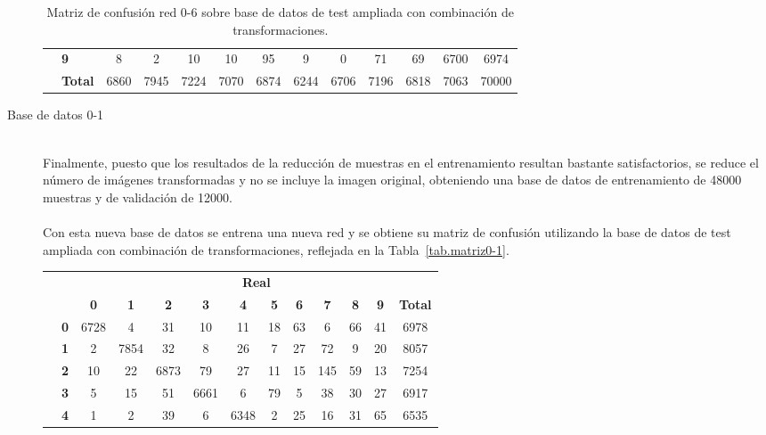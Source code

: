 \begin{description}
\begin{table}[H]
\begin{tabular}{|c|l|c|c|c|c|c|c|c|c|c|c|c|}
			& \textbf{9} & 8 & 2 & 10 & 10 & 95 & 9 & 0 & 71 & 69 & \cellcolor{lightgray}6700 & 6974\\ \cline{2-13}
			& \textbf{Total} & 6860 & 7945 & 7224 & 7070 & 6874 & 6244 & 6706 & 7196 & 6818 & 7063 & 70000\\ \hline
		\end{tabular}
		\caption{Matriz de confusión red 0-6 sobre base de datos de test ampliada con combinación de transformaciones.}
		\label{tab.matriz0-6}
	\end{table}
	\item[Base de datos 0-1] \hfill 
	\vspace{10pt}
	\\
	Finalmente, puesto que los resultados de la reducción de muestras en el entrenamiento resultan bastante satisfactorios, se reduce el número de imágenes transformadas y no se incluye la imagen original, obteniendo una base de datos de entrenamiento de 48000 muestras y de validación de 12000.\\
	\vspace{-10pt}
	\\
	Con esta nueva base de datos se entrena una nueva red y se obtiene su matriz de confusión utilizando la base de datos de test ampliada con combinación de transformaciones, reflejada en la Tabla~\ref{tab.matriz0-1}.
	\begin{table}[H]
		\centering
		\begin{tabular}{|c|l|c|c|c|c|c|c|c|c|c|c|c|}
			\cline{3-13} 
			\multicolumn{2}{c|}{} & \multicolumn{11}{c|}{\textbf{Real}} \\ \cline{3-13} 
			\multicolumn{2}{c|}{} & \textbf{0} & \textbf{1} & \textbf{2} &  \textbf{3} & \textbf{4} & \textbf{5} & \textbf{6} & \textbf{7} & \textbf{8} & \textbf{9} & \textbf{Total}\\ \hline
			\multirow{10}{0.5cm}{\rotatebox{90}{\textbf{Predicción}}}& \textbf{0} & \cellcolor{lightgray}6728 & 4 & 31 & 10 & 11 & 18 & 63 & 6 & 66 & 41 & 6978\\ \cline{2-13}
			& \textbf{1} & 2 & \cellcolor{lightgray}7854 & 32 & 8 & 26 & 7 & 27 & 72 & 9 & 20 & 8057\\ \cline{2-13}
			& \textbf{2} & 10 & 22 & \cellcolor{lightgray}6873 & 79 & 27 & 11 & 15 & 145 & 59 & 13 & 7254\\ \cline{2-13}
			& \textbf{3} & 5 & 15 & 51 & \cellcolor{lightgray}6661 & 6 & 79 & 5 & 38 & 30 & 27 & 6917\\ \cline{2-13}
			& \textbf{4} & 1 & 2 & 39 & 6 & \cellcolor{lightgray}6348 & 2 & 25 & 16 & 31 & 65 & 6535\\ \cline{2-13}

\end{tabular}
\end{table}
\end{description}
